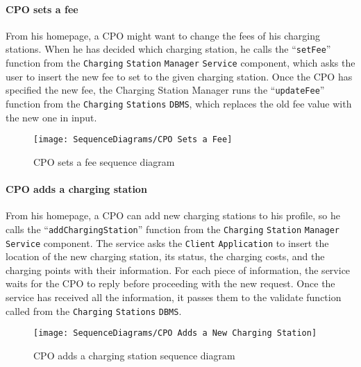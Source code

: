 \paragraph{CPO sets a fee}
From his homepage, a CPO might want to change the fees of his charging stations.
When he has decided which charging station, he calls the ``\verb|setFee|'' function from the \verb|Charging| \verb|Station| \verb|Manager| \verb|Service| component, which asks the user to insert the new fee to set to the given charging station.
Once the CPO has specified the new fee, the Charging Station Manager runs the ``\verb|updateFee|'' function from the \verb|Charging| \verb|Stations| \verb|DBMS|, which replaces the old fee value with the new one in input.
\begin{figure}[H]
    \begin{center}
        \texttt{[image: SequenceDiagrams/CPO Sets a Fee]}
        \caption{CPO sets a fee sequence diagram}
        \label{cpo_sets_fee}
    \end{center}
\end{figure}

\paragraph{CPO adds a charging station}
From his homepage, a CPO can add new charging stations to his profile, so he calls the ``\verb|addChargingStation|'' function from the \verb|Charging| \verb|Station| \verb|Manager| \verb|Service| component.
The service asks the \verb|Client| \verb|Application| to insert the location of the new charging station, its status, the charging costs, and the charging points with their information.
For each piece of information, the service waits for the CPO to reply before proceeding with the new request.
Once the service has received all the information, it passes them to the validate function called from the \verb|Charging| \verb|Stations| \verb|DBMS|\@.
\begin{figure}[H]
    \begin{center}
        \texttt{[image: SequenceDiagrams/CPO Adds a New Charging Station]}
        \caption{CPO adds a charging station sequence diagram}
        \label{cpo_adds_new_charging_station}
    \end{center}
\end{figure}

